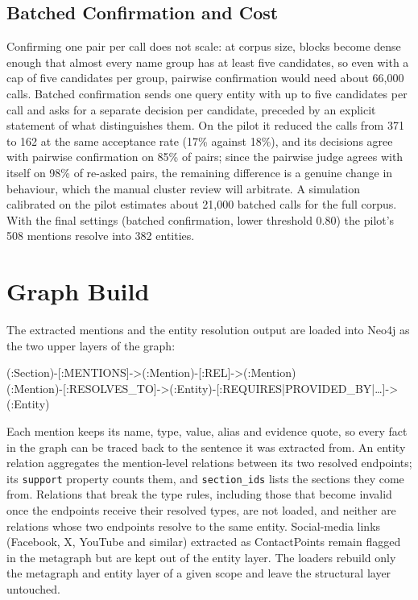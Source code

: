 \subsection{Batched Confirmation and Cost}

Confirming one pair per call does not scale: at corpus size, blocks become dense
enough that almost every name group has at least five candidates, so even with a
cap of five candidates per group, pairwise confirmation would need about 66{,}000
calls. Batched confirmation sends one query entity with up to five candidates per
call and asks for a separate decision per candidate, preceded by an explicit
statement of what distinguishes them. On the pilot it reduced the calls from 371 to
162 at the same acceptance rate (17\% against 18\%), and its decisions agree with
pairwise confirmation on 85\% of pairs; since the pairwise judge agrees with itself
on 98\% of re-asked pairs, the remaining difference is a genuine change in behaviour,
which the manual cluster review will arbitrate. A simulation calibrated on the pilot
estimates about 21{,}000 batched calls for the full corpus. With the final settings
(batched confirmation, lower threshold 0.80) the pilot's 508 mentions resolve into
382 entities.


\section{Graph Build}\label{sec:kg:build}

The extracted mentions and the entity resolution output are loaded into Neo4j as the
two upper layers of the graph:
\begin{center}
\small\ttfamily
(:Section)-[:MENTIONS]->(:Mention)-[:REL]->(:Mention)\\
(:Mention)-[:RESOLVES\_TO]->(:Entity)-[:REQUIRES|PROVIDED\_BY|\ldots]->(:Entity)
\end{center}
Each mention keeps its name, type, value, alias and evidence quote, so every fact in
the graph can be traced back to the sentence it was extracted from. An entity
relation aggregates the mention-level relations between its two resolved endpoints;
its \texttt{support} property counts them, and \texttt{section\_ids} lists the
sections they come from. Relations that break the type rules, including those that
become invalid once the endpoints receive their resolved types, are not loaded, and
neither are relations whose two endpoints resolve to the same entity. Social-media
links (Facebook, X, YouTube and similar) extracted as ContactPoints remain flagged in
the metagraph but are kept out of the entity layer. The loaders rebuild only the
metagraph and entity layer of a given scope and leave the structural layer untouched.


